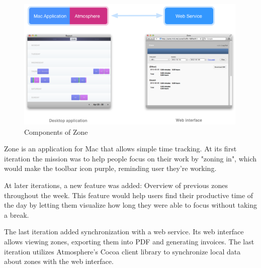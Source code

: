 \begin{figure}[htbp]
  \centering
    \includegraphics[height=2.5in]{figures/ZoneDiagram.png}
  \caption{Components of Zone}
  \label{fig:figures_ZoneDiagram}
\end{figure}

Zone is an application for Mac that allows simple time tracking. At its first iteration the mission was to help people focus on their work by "zoning in", which would make the toolbar icon purple, reminding user they're working.

At later iterations, a new feature was added: Overview of previous zones throughout the week. This feature would help users find their productive time of the day by letting them visualize how long they were able to focus without taking a break.

The last iteration added synchronization with a web service. Its web interface allows viewing zones, exporting them into PDF and generating invoices. The last iteration utilizes Atmosphere's Cocoa client library to synchronize local data about zones with the web interface.


